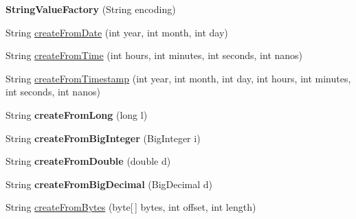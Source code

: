 \begin{DoxyCompactItemize}
\item 
\mbox{\label{classcom_1_1mysql_1_1cj_1_1result_1_1_string_value_factory_a5bd9a9fbad0e523e9bf4081143d89e62}} 
{\bfseries String\+Value\+Factory} (String encoding)
\item 
String \mbox{\hyperlink{classcom_1_1mysql_1_1cj_1_1result_1_1_string_value_factory_a845e3704aa7f1a243b1fca5975dff12a}{create\+From\+Date}} (int year, int month, int day)
\item 
String \mbox{\hyperlink{classcom_1_1mysql_1_1cj_1_1result_1_1_string_value_factory_a403e61bfaa13268e2eb0a15ff92e0aea}{create\+From\+Time}} (int hours, int minutes, int seconds, int nanos)
\item 
String \mbox{\hyperlink{classcom_1_1mysql_1_1cj_1_1result_1_1_string_value_factory_aff6a7f18d539842dd935facd7df39008}{create\+From\+Timestamp}} (int year, int month, int day, int hours, int minutes, int seconds, int nanos)
\item 
\mbox{\label{classcom_1_1mysql_1_1cj_1_1result_1_1_string_value_factory_a5042159a05354abc9635cb4c4ddbf4bc}} 
String {\bfseries create\+From\+Long} (long l)
\item 
\mbox{\label{classcom_1_1mysql_1_1cj_1_1result_1_1_string_value_factory_a5f8b67f6802da33bca7e2d1e91ad8fb0}} 
String {\bfseries create\+From\+Big\+Integer} (Big\+Integer i)
\item 
\mbox{\label{classcom_1_1mysql_1_1cj_1_1result_1_1_string_value_factory_a6f7c243f160705b6521c7db2e27c77dd}} 
String {\bfseries create\+From\+Double} (double d)
\item 
\mbox{\label{classcom_1_1mysql_1_1cj_1_1result_1_1_string_value_factory_aeb5994f74d36ed8904895e7057910c69}} 
String {\bfseries create\+From\+Big\+Decimal} (Big\+Decimal d)
\item 
String \mbox{\hyperlink{classcom_1_1mysql_1_1cj_1_1result_1_1_string_value_factory_a72878f32e5fe17e1266d38c9145768b6}{create\+From\+Bytes}} (byte\mbox{[}$\,$\mbox{]} bytes, int offset, int length)

\end{DoxyCompactItemize}
